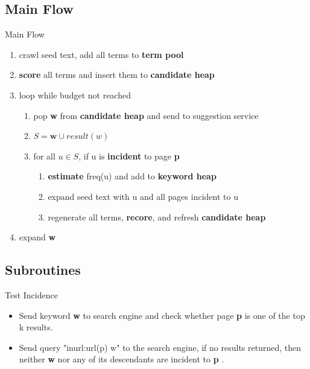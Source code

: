 \documentclass{beamer}
\newcommand{\page}{\textbf{p} }
\newcommand{\keyword}{\textbf{w} }
\newcommand{\cheap}{\textbf{candidate heap} }
\newcommand{\kheap}{\textbf{keyword heap} }
\begin{document}
    \subsection{Main Flow}
    \begin{frame}{Main Flow}
        \begin{enumerate}
        \item crawl seed text, add all terms to \textbf{term pool} 
        \item \textbf{score} all terms and  insert them to \cheap
        \item loop while budget not reached
            \begin{enumerate}
            \item pop \keyword from \cheap and send to suggestion service
            \item $ S = \keyword \cup result(w) $
            \item for all $ u \in S $, if u is \textbf{incident} to page \page
                \begin{enumerate}
                \item \textbf{estimate} freq(u) and add to \kheap
                \item expand seed text with u and all pages incident to u 
                \item regenerate all terms, \textbf{recore}, and refresh \cheap
                \end{enumerate}
            \end{enumerate}
            \item expand \keyword
        \end{enumerate}
    \end{frame}

    \subsection{Subroutines}
    \begin{frame}{Test Incidence}
        \begin{itemize}
        \item Send keyword \keyword to search engine and check whether page \page is one of the top k results.
        \item Send query "inurl:url(p) w" to the search engine, if no results returned, then neither \keyword nor any of its descendants are incident to \page .
        \end{itemize}
    \end{frame}
\end{document}
